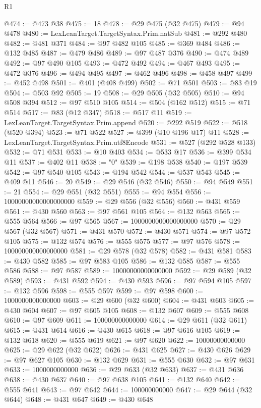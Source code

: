 \begin{lexlean}{R1}
\begin{coremodule}
@474 := @473 @38
@475 := 18
@478 := @29 @475 (@32 @475)
@479 := @94 @478
@480 := LexLeanTarget.TargetSyntax.Prim.natSub
@481 := @292 @480
@482 := @481 @371
@484 := @97 @482 @105
@485 := @369 @484
@486 := @132 @485
@487 := @479 @486
@489 := @97 @487 @376
@490 := @474 @489
@492 := @97 @490 @105
@493 := @472 @492
@494 := @467 @493
@495 := @472 @376
@496 := @494 @495
@497 := @462 @496
@498 := @458 @497
@499 := @452 @498
@501 := @401 (@408 @499)
@502 := @71 @501
@503 := @83 @19
@504 := @503 @92
@505 := 19
@508 := @29 @505 (@32 @505)
@510 := @94 @508 @394
@512 := @97 @510 @105
@514 := @504 (@162 @512)
@515 := @71 @514
@517 := @83 (@12 @347)
@518 := @517 @11
@519 := LexLeanTarget.TargetSyntax.Prim.append
@520 := @292 @519
@522 := @518 (@520 @394)
@523 := @71 @522
@527 := @399 (@10 @196 @17) @11
@528 := LexLeanTarget.TargetSyntax.Prim.utf8Encode
@531 := @527 (@292 @528 @133)
@532 := @71 @531
@533 := @10 @403
@534 := @533 @17
@536 := @399 @534 @11
@537 := @402 @11
@538 := "0"
@539 := @198 @538
@540 := @197 @539
@542 := @97 @540 @105
@543 := @194 @542
@544 := @537 @543
@545 := @409 @11
@546 := 20
@549 := @29 @546 (@32 @546)
@550 := @94 @549
@551 := 21
@554 := @29 @551 (@32 @551)
@555 := @94 @554
@556 := 10000000000000000000
@559 := @29 @556 (@32 @556)
@560 := @431 @559
@561 := @430 @560
@563 := @97 @561 @105
@564 := @132 @563
@565 := @555 @564
@566 := @97 @565
@567 := 1000000000000000000
@570 := @29 @567 (@32 @567)
@571 := @431 @570
@572 := @430 @571
@574 := @97 @572 @105
@575 := @132 @574
@576 := @555 @575
@577 := @97 @576
@578 := 100000000000000000
@581 := @29 @578 (@32 @578)
@582 := @431 @581
@583 := @430 @582
@585 := @97 @583 @105
@586 := @132 @585
@587 := @555 @586
@588 := @97 @587
@589 := 10000000000000000
@592 := @29 @589 (@32 @589)
@593 := @431 @592
@594 := @430 @593
@596 := @97 @594 @105
@597 := @132 @596
@598 := @555 @597
@599 := @97 @598
@600 := 1000000000000000
@603 := @29 @600 (@32 @600)
@604 := @431 @603
@605 := @430 @604
@607 := @97 @605 @105
@608 := @132 @607
@609 := @555 @608
@610 := @97 @609
@611 := 100000000000000
@614 := @29 @611 (@32 @611)
@615 := @431 @614
@616 := @430 @615
@618 := @97 @616 @105
@619 := @132 @618
@620 := @555 @619
@621 := @97 @620
@622 := 10000000000000
@625 := @29 @622 (@32 @622)
@626 := @431 @625
@627 := @430 @626
@629 := @97 @627 @105
@630 := @132 @629
@631 := @555 @630
@632 := @97 @631
@633 := 1000000000000
@636 := @29 @633 (@32 @633)
@637 := @431 @636
@638 := @430 @637
@640 := @97 @638 @105
@641 := @132 @640
@642 := @555 @641
@643 := @97 @642
@644 := 100000000000
@647 := @29 @644 (@32 @644)
@648 := @431 @647
@649 := @430 @648

\end{coremodule}
\end{lexlean}

